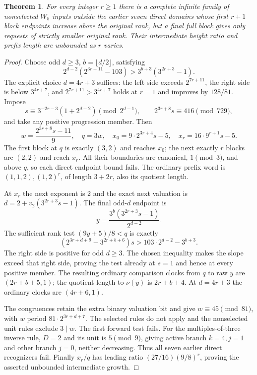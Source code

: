 \documentclass[11pt]{article}
\newtheorem{theorem}{Theorem}
\begin{document}
\begin{theorem}\label{thm:longforward}
For every integer $r\ge1$ there is a complete infinite family of
nonselected $W_5$ inputs outside the earlier seven direct domains whose
first $r+1$ block endpoints increase above the original rank, but a final
full block gives only requests of strictly smaller original rank.
Their intermediate height ratio and prefix length are unbounded as
$r$ varies.
\end{theorem}
\begin{proof}
Choose odd $d\ge3$, $b=\lfloor d/2\rfloor$, satisfying
\[
 2^{d-2}(2^{3r+11}-103)>3^{b+3}(3^{2r+3}-1).
\]
The explicit choice $d=4r+3$ suffices: the left side exceeds
$2^{7r+11}$, the right side is below $3^{4r+7}$, and
$2^{7r+11}>3^{4r+7}$ holds at $r=1$ and improves by $128/81$.
Impose
\[
 s\equiv3^{-2r-3}(1+2^{d-2})\pmod{2^{d-1}},\qquad
 2^{3r+8}s\equiv416\pmod{729},
\]
and take any positive progression member. Then
\[
 w=\frac{2^{3r+8}s-11}{9},\quad q=3w,\quad
 x_0=9\cdot2^{3r+4}s-5,\quad x_r=16\cdot9^{r+1}s-5.
\]
The first block at $q$ is exactly $(3,2)$ and reaches $x_0$; the next
exactly $r$ blocks are $(2,2)$ and reach $x_r$. All their boundaries
are canonical, $1\pmod3$, and above $q$, so each direct endpoint bound
fails. The ordinary prefix word is $(1,1,2),(1,2)^r$, of length
$3+2r$, also its quotient length.

At $x_r$ the next exponent is $2$ and the exact next valuation is
$d=2+v_2(3^{2r+3}s-1)$. The final odd-$d$ endpoint is
\[
 y=\frac{3^b(3^{2r+3}s-1)}{2^{d-2}}.
\]
The sufficient rank test $(9y+5)/8<q$ is exactly
\[
 (2^{3r+d+9}-3^{2r+b+6})s>
 103\cdot2^{d-2}-3^{b+3}.
\]
The right side is positive for odd $d\ge3$. The chosen inequality
makes the slope exceed that right side, proving the test already at
$s=1$ and hence at every positive member. The resulting ordinary
comparison clocks from $q$ to raw $y$ are $(2r+b+5,1)$; the quotient
length to $\nu(y)$ is $2r+b+4$. At $d=4r+3$ the ordinary clocks are
$(4r+6,1)$.

The congruences retain the extra binary valuation bit and give
$w\equiv45\pmod{81}$, with $w$ period $81\cdot2^{3r+d+7}$.
The selected rules do not apply and the nonselected unit rules exclude
$3\mid w$. The first forward test fails. For the multiples-of-three
inverse rule, $D=2$ and its unit is $5\pmod9$, giving active branch
$k=4,j=1$ and other branch $j=0$, neither decreasing. Thus all seven
earlier direct recognizers fail. Finally $x_r/q$ has leading ratio
$(27/16)(9/8)^r$, proving the asserted unbounded intermediate growth.
\end{proof}
\end{document}
